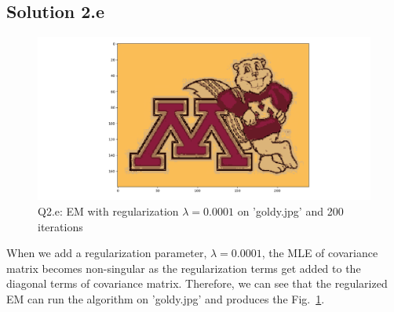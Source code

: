 \subsection*{Solution 2.e}
\begin{figure}[h!]
	\centering
	\includegraphics[scale=0.5]{q2_e_goldy_em}
	\caption{Q2.e: EM with regularization $\lambda = 0.0001$ on 'goldy.jpg' and 200 iterations}
	\label{fig:2e_goldy}
\end{figure}
When we add a regularization parameter, $\lambda = 0.0001$, the MLE of covariance matrix becomes non-singular as the regularization terms get added to the diagonal terms of covariance matrix. Therefore, we can see that the regularized EM can run the algorithm on 'goldy.jpg' and produces the Fig.~\ref{fig:2e_goldy}.